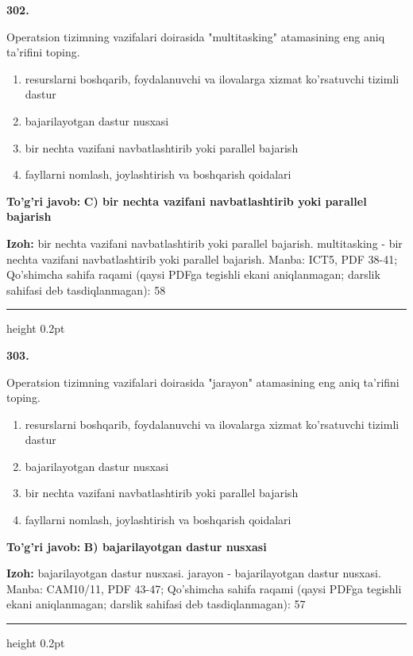 \documentclass[10pt,a4paper]{article}
\begin{document}
{\bfseries\sffamily\color{ink} 302.}
\par
Operatsion tizimning vazifalari doirasida "multitasking" atamasining eng aniq ta'rifini toping.
\begin{enumerate}[label=\Alph*),leftmargin=9mm]
\item resurslarni boshqarib, foydalanuvchi va ilovalarga xizmat ko'rsatuvchi tizimli dastur
\item bajarilayotgan dastur nusxasi
\item bir nechta vazifani navbatlashtirib yoki parallel bajarish
\item fayllarni nomlash, joylashtirish va boshqarish qoidalari
\end{enumerate}
\begin{tcolorbox}[enhanced,breakable,colback=teal!4,colframe=teal!60!black,boxrule=0.45pt,arc=1.2mm,left=2.7mm,right=2.7mm,top=1.8mm,bottom=1.8mm,before skip=2mm,after skip=2mm]
{\bfseries\sffamily\color{teal}To'g'ri javob:} \textbf{C) bir nechta vazifani navbatlashtirib yoki parallel bajarish}
\par\smallskip
{\bfseries Izoh:} bir nechta vazifani navbatlashtirib yoki parallel bajarish. multitasking - bir nechta vazifani navbatlashtirib yoki parallel bajarish. Manba: ICT5, PDF 38-41; Qo'shimcha sahifa raqami (qaysi PDFga tegishli ekani aniqlanmagan; darslik sahifasi deb tasdiqlanmagan): 58
\end{tcolorbox}
\vspace{2mm}\hrule height 0.2pt\vspace{3mm}

{\bfseries\sffamily\color{ink} 303.}
\par
Operatsion tizimning vazifalari doirasida "jarayon" atamasining eng aniq ta'rifini toping.
\begin{enumerate}[label=\Alph*),leftmargin=9mm]
\item resurslarni boshqarib, foydalanuvchi va ilovalarga xizmat ko'rsatuvchi tizimli dastur
\item bajarilayotgan dastur nusxasi
\item bir nechta vazifani navbatlashtirib yoki parallel bajarish
\item fayllarni nomlash, joylashtirish va boshqarish qoidalari
\end{enumerate}
\begin{tcolorbox}[enhanced,breakable,colback=teal!4,colframe=teal!60!black,boxrule=0.45pt,arc=1.2mm,left=2.7mm,right=2.7mm,top=1.8mm,bottom=1.8mm,before skip=2mm,after skip=2mm]
{\bfseries\sffamily\color{teal}To'g'ri javob:} \textbf{B) bajarilayotgan dastur nusxasi}
\par\smallskip
{\bfseries Izoh:} bajarilayotgan dastur nusxasi. jarayon - bajarilayotgan dastur nusxasi. Manba: CAM10/11, PDF 43-47; Qo'shimcha sahifa raqami (qaysi PDFga tegishli ekani aniqlanmagan; darslik sahifasi deb tasdiqlanmagan): 57
\end{tcolorbox}
\vspace{2mm}\hrule height 0.2pt\vspace{3mm}
\end{document}
